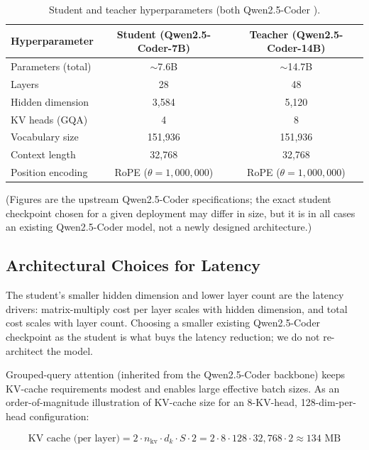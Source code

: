 \documentclass[11pt,a4paper]{article}
\begin{document}
\begin{table}[H]
\centering
\caption{Student and teacher hyperparameters (both Qwen2.5-Coder \cite{qwen25coder}).}
\label{tab:arch}
\begin{tabular}{lcc}
\toprule
\textbf{Hyperparameter} & \textbf{Student (Qwen2.5-Coder-7B)} & \textbf{Teacher (Qwen2.5-Coder-14B)} \\
\midrule
Parameters (total)           & $\sim$7.6B & $\sim$14.7B \\
Layers                       & 28 & 48 \\
Hidden dimension             & 3{,}584 & 5{,}120 \\
KV heads (GQA)               & 4  & 8 \\
Vocabulary size              & 151{,}936 & 151{,}936 \\
Context length               & 32{,}768 & 32{,}768 \\
Position encoding            & RoPE ($\theta = 1{,}000{,}000$) & RoPE ($\theta = 1{,}000{,}000$) \\
\bottomrule
\end{tabular}
\end{table}

\noindent (Figures are the upstream Qwen2.5-Coder specifications; the exact student checkpoint chosen
for a given deployment may differ in size, but it is in all cases an existing Qwen2.5-Coder model, not
a newly designed architecture.)

\subsection{Architectural Choices for Latency}

The student's smaller hidden dimension and lower layer count are the latency drivers: matrix-multiply
cost per layer scales with hidden dimension, and total cost scales with layer count. Choosing a
smaller existing Qwen2.5-Coder checkpoint as the student is what buys the latency reduction; we do not
re-architect the model.

Grouped-query attention (inherited from the Qwen2.5-Coder backbone) keeps KV-cache requirements modest
and enables large effective batch sizes. As an order-of-magnitude illustration of KV-cache size for an
8-KV-head, 128-dim-per-head configuration:

\begin{equation}
  \text{KV cache (per layer)} = 2 \cdot n_{\text{kv}} \cdot d_k \cdot S \cdot 2 = 2 \cdot 8 \cdot 128 \cdot 32{,}768 \cdot 2 \approx 134 \text{ MB}
\end{equation}
\end{document}
